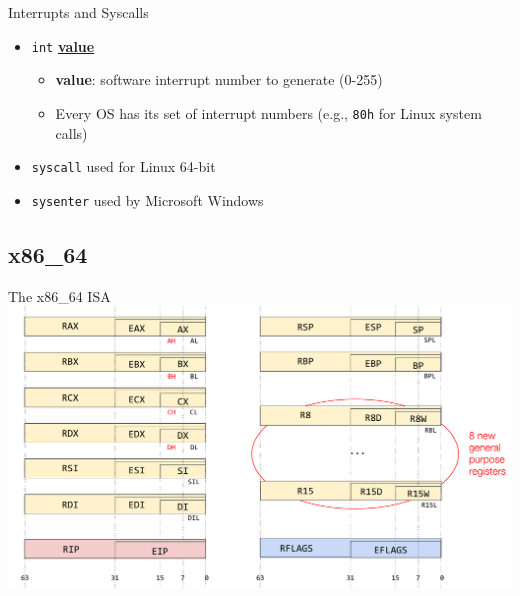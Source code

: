 \documentclass[]{beamer}
\begin{document}
\begin{frame}{Interrupts and Syscalls}

  \begin{itemize}
  	\item {\tt int} \underline{\textbf{value}}
  		\begin{itemize} 
  			\item \textbf{value}: software interrupt number to generate (0-255)
  			\item Every OS has its set of interrupt numbers (e.g., {\tt 80h} for Linux system calls)
  		\end{itemize}
  	\item {\tt syscall} used for Linux 64-bit
  	\item {\tt sysenter} used by Microsoft Windows
  \end{itemize}
\end{frame}

\subsection{x86\_64}
\begin{frame}{The x86\_64 ISA}
  \centering
  \includegraphics[width=1\linewidth]{images/x86-64}
\end{frame}
\end{document}
